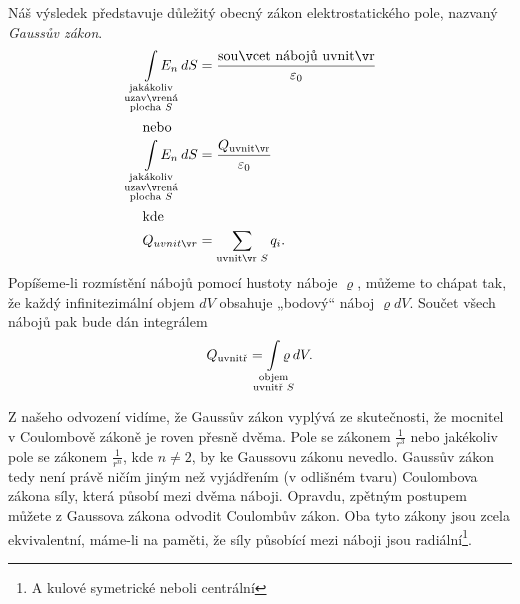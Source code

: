     Náš výsledek představuje důležitý obecný zákon elektrostatického pole, nazvaný \emph{Gaussův zákon}.
    \begin{align}
      \limitint_{\mathclap{\substack{\text{jakákoliv}      \\
                                     \text{uzavřená}       \\
                                     \text{plocha }S}}} E_n\dd{S} 
              &= \frac{\text{součet nábojů uvnitř}}{\varepsilon_0} \label{fyz:fey_eq_elstat34} \\
      \shortintertext{nebo}        
      \limitint_{\mathclap{\substack{\text{jakákoliv}       \\
                                            \text{uzavřená} \\
                                            \text{plocha }S}}} E_n\dd{S}
              &= \frac{Q_{\text{uvnitř}}}{\varepsilon_0}           \label{fyz:fey_eq_elstat35} \\            
      \shortintertext{kde}
      Q_{uvnitř} 
              &= \sum\limits_{\text{uvnitř }S}q_i.                 \label{fyz:fey_eq_elstat36}  
    \end{align}
    Popíšeme-li rozmístění nábojů pomocí hustoty náboje \(\varrho\), můžeme to chápat tak, že každý 
    infinitezimální objem \(dV\) obsahuje „bodový“ náboj \(\varrho dV\). Součet všech nábojů pak 
    bude dán integrálem
    \begin{equation}\label{fyz:fey_eq_elstat37}
     Q_{\text{uvnitř}} = \limitint_{\mathclap{\substack{\text{objem}\\
                                                 \text{uvnitř }S}}} \varrho\dd{V}.
    \end{equation}
    
    Z našeho odvození vidíme, že Gaussův zákon vyplývá ze skutečnosti, že mocnitel v Coulombově 
    zákoně je roven přesně dvěma. Pole se zákonem \(\frac{1}{r^3}\) nebo jakékoliv pole se zákonem 
    \(\frac{1}{r^n}\), kde \(n\neq2\), by ke Gaussovu zákonu nevedlo. Gaussův zákon tedy není právě 
    ničím jiným než vyjádřením (v odlišném tvaru) Coulombova zákona síly, která působí mezi dvěma 
    náboji. Opravdu, zpětným postupem můžete z Gaussova zákona odvodit Coulombův zákon. Oba tyto 
    zákony jsou zcela ekvivalentní, máme-li na paměti, že síly působící mezi náboji jsou 
    radiální\footnote{A kulové symetrické neboli centrální}.
    
